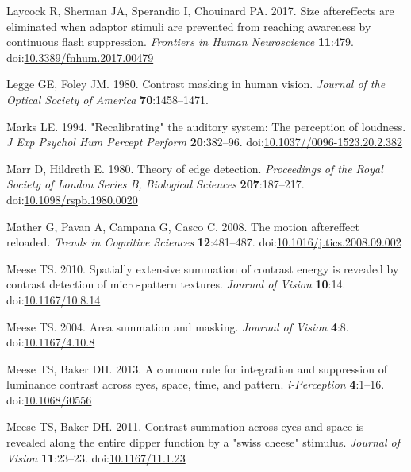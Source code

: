 \documentclass[
]{article}
\newlength{\cslhangindent}
\newlength{\cslentryspacingunit} %
\newenvironment{CSLReferences}[2] %
 {%
  \setlength{\parindent}{0pt}
  \ifodd #1
  \let\oldpar\par
  \def\par{\hangindent=\cslhangindent\oldpar}
  \fi
  \setlength{\parskip}{#2\cslentryspacingunit}
 }%
 {}
\begin{document}
\begin{CSLReferences}{1}{0}
\leavevmode{}%
Laycock R, Sherman JA, Sperandio I, Chouinard PA. 2017. Size aftereffects are eliminated when adaptor stimuli are prevented from reaching awareness by continuous flash suppression. \emph{Frontiers in Human Neuroscience} \textbf{11}:479. doi:\href{https://doi.org/10.3389/fnhum.2017.00479}{10.3389/fnhum.2017.00479}

\leavevmode{}%
Legge GE, Foley JM. 1980. Contrast masking in human vision. \emph{Journal of the Optical Society of America} \textbf{70}:1458--1471.

\leavevmode{}%
Marks LE. 1994. "Recalibrating" the auditory system: The perception of loudness. \emph{J Exp Psychol Hum Percept Perform} \textbf{20}:382--96. doi:\href{https://doi.org/10.1037//0096-1523.20.2.382}{10.1037//0096-1523.20.2.382}

\leavevmode{}%
Marr D, Hildreth E. 1980. Theory of edge detection. \emph{Proceedings of the Royal Society of London Series B, Biological Sciences} \textbf{207}:187--217. doi:\href{https://doi.org/10.1098/rspb.1980.0020}{10.1098/rspb.1980.0020}

\leavevmode{}%
Mather G, Pavan A, Campana G, Casco C. 2008. The motion aftereffect reloaded. \emph{Trends in Cognitive Sciences} \textbf{12}:481--487. doi:\href{https://doi.org/10.1016/j.tics.2008.09.002}{10.1016/j.tics.2008.09.002}

\leavevmode{}%
Meese TS. 2010. Spatially extensive summation of contrast energy is revealed by contrast detection of micro-pattern textures. \emph{Journal of Vision} \textbf{10}:14. doi:\href{https://doi.org/10.1167/10.8.14}{10.1167/10.8.14}

\leavevmode{}%
Meese TS. 2004. Area summation and masking. \emph{Journal of Vision} \textbf{4}:8. doi:\href{https://doi.org/10.1167/4.10.8}{10.1167/4.10.8}

\leavevmode{}%
Meese TS, Baker DH. 2013. A common rule for integration and suppression of luminance contrast across eyes, space, time, and pattern. \emph{i-Perception} \textbf{4}:1--16. doi:\href{https://doi.org/10.1068/i0556}{10.1068/i0556}

\leavevmode{}%
Meese TS, Baker DH. 2011. Contrast summation across eyes and space is revealed along the entire dipper function by a "swiss cheese" stimulus. \emph{Journal of Vision} \textbf{11}:23--23. doi:\href{https://doi.org/10.1167/11.1.23}{10.1167/11.1.23}


\end{CSLReferences}
\end{document}

